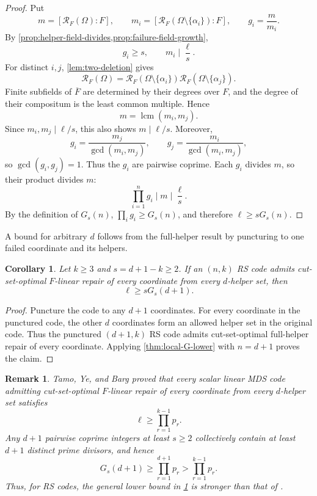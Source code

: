 \documentclass[11pt,onecolumn]{IEEEtran}
\newtheorem{remark}{Remark}
\newtheorem{corollary}{Corollary}
\newcommand{\lcmop}{\operatorname{lcm}}
\newcommand{\crf}{\mathscr R}
\begin{document}
\begin{proof}
Put
\[
m=[\crf_F(\Omega):F],
\qquad
m_i=[\crf_F(\Omega\setminus\{\alpha_i\}):F],
\qquad
g_i=\frac{m}{m_i}.
\]
By \cref{prop:helper-field-divides,prop:failure-field-growth},
\[
g_i\ge s,
\qquad
m_i\mid\frac{\ell}{s}.
\]
For distinct $i,j$, \cref{lem:two-deletion} gives
\[
\crf_F(\Omega)
=
\crf_F(\Omega\setminus\{\alpha_i\})
\crf_F(\Omega\setminus\{\alpha_j\}).
\]
Finite subfields of $\overline F$ are determined by their degrees over
$F$, and the degree of their compositum is the least common multiple.
Hence
\[
m=\lcmop(m_i,m_j).
\]
Since $m_i,m_j\mid\ell/s$, this also shows $m\mid\ell/s$.  Moreover,
\[
g_i=\frac{m_j}{\gcd(m_i,m_j)},
\qquad
g_j=\frac{m_i}{\gcd(m_i,m_j)},
\]
so $\gcd(g_i,g_j)=1$.  Thus the $g_i$ are pairwise coprime.  Each
$g_i$ divides $m$, so their product divides $m$:
\[
\prod_{i=1}^ng_i\mid m\mid\frac{\ell}{s}.
\]
By the definition of $G_s(n)$,
$\prod_i g_i\ge G_s(n)$, and therefore $\ell\ge sG_s(n)$.
\end{proof}

A bound for arbitrary $d$ follows from the full-helper result by
puncturing to one failed coordinate and its helpers.

\begin{corollary}
\label{cor:one-puncturing}
Let $k\ge3$ and $s=d+1-k\ge2$. If an $(n,k)$ RS code admits
cut-set-optimal $F$-linear repair of every coordinate from every
$d$-helper set, then
\[
\ell\ge sG_s(d+1).
\]
\end{corollary}

\begin{proof}
Puncture the code to any $d+1$ coordinates.  For every coordinate in
the punctured code, the other $d$ coordinates form an allowed helper
set in the original code.  Thus the punctured $(d+1,k)$ RS code admits
cut-set-optimal full-helper repair of every coordinate.  Applying
\cref{thm:local-G-lower} with $n=d+1$ proves the claim.
\end{proof}

\begin{remark}
Tamo, Ye, and Barg \cite[Theorem~5]{TYB2017} proved that every scalar
linear MDS code admitting cut-set-optimal $F$-linear repair of every
coordinate from every $d$-helper set satisfies
\[
\ell\ge\prod_{r=1}^{k-1}p_r.
\]
Any $d+1$ pairwise coprime integers at least $s\ge2$ collectively
contain at least $d+1$ distinct prime divisors, and hence
\[
G_s(d+1)\ge\prod_{r=1}^{d+1}p_r > \prod_{r=1}^{k-1}p_r.
\]
Thus, for RS codes, the general lower bound in \cref{cor:one-puncturing}
is stronger than that of \cite[Theorem~5]{TYB2017}.
\end{remark}
\end{document}

